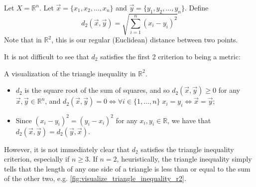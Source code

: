 \documentclass[notoc,notitlepage]{tufte-book}
\begin{document}
\begin{eg}\label{eg:euclidean_metric}
  Let $X = \mathbb{R}^n$. Let $\vec{x} = \{ x_1, x_2, \ldots, x_n \}$ and $\vec{y} = \{ y_1, y_2, \ldots, y_n \}$. Define
  \begin{equation*}
    d_2(\vec{x}, \vec{y}) = \sqrt{ \sum_{i=1}^{n} ( x_i - y_i )^2 }
  \end{equation*}
  Note that in $\mathbb{R}^2$, this is our regular (Euclidean) distance between two points.

  It is not difficult to see that $d_2$ satisfies the first 2 criterion to being a metric:
  \begin{marginfigure}
    \caption{A visualization of the triangle inequality in $\mathbb{R}^2$.}
    \label{fig:visualize_triangle_inequality_r2}
  \end{marginfigure}
  \begin{itemize}
    \item $d_2$ is the square root of the sum of squares, and so $d_2(\vec{x}, \vec{y}) \geq 0$ for any $\vec{x}, \vec{y} \in \mathbb{R}^n$, and $d_2(\vec{x}, \vec{y}) = 0 \iff \forall i \in \{1, \ldots, n\} \; x_i = y_i \iff \vec{x} = \vec{y}$;
      \item Since $(x_i - y_i)^2 = (y_i - x_i)^2$ for any $x_i, y_i \in \mathbb{R}$, we have that $d_2(\vec{x}, \vec{y}) = d_2(\vec{y}, \vec{x})$.
  \end{itemize}
  However, it is not immediately clear that $d_2$ satisfies the triangle inequality criterion, especially if $n \geq 3$. If $n = 2$, heuristically, the triangle inequality simply tells that the length of any one side of a triangle is less than or equal to the sum of the other two, e.g. \cref{fig:visualize_triangle_inequality_r2}.
\end{eg}
\end{document}
